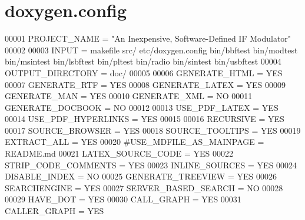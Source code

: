 \hypertarget{doxygen_8config_source}{\section{doxygen.\+config}
\label{doxygen_8config_source}
}

\begin{DoxyCode}
00001 PROJECT\_NAME = "An Inexpensive, Software-Defined IF Modulator"
00002 
00003 INPUT = makefile src/ etc/doxygen.config bin/bbftest bin/modtest bin/msintest bin/lsbftest bin/pltest
       bin/radio bin/sintest bin/usbftest
00004 OUTPUT\_DIRECTORY = doc/
00005 
00006 GENERATE\_HTML = YES
00007 GENERATE\_RTF = YES
00008 GENERATE\_LATEX = YES
00009 GENERATE\_MAN = YES
00010 GENERATE\_XML = NO
00011 GENERATE\_DOCBOOK = NO
00012 
00013 USE\_PDF\_LATEX = YES
00014 USE\_PDF\_HYPERLINKS = YES
00015 
00016 RECURSIVE = YES
00017 SOURCE\_BROWSER = YES
00018 SOURCE\_TOOLTIPS = YES
00019 EXTRACT\_ALL = YES
00020 #USE\_MDFILE\_AS\_MAINPAGE = README.md
00021 LATEX\_SOURCE\_CODE = YES
00022 STRIP\_CODE\_COMMENTS = YES
00023 INLINE\_SOURCES = YES
00024 DISABLE\_INDEX = NO
00025 GENERATE\_TREEVIEW = YES
00026 SEARCHENGINE = YES
00027 SERVER\_BASED\_SEARCH = NO
00028 
00029 HAVE\_DOT = YES
00030 CALL\_GRAPH = YES
00031 CALLER\_GRAPH = YES
\end{DoxyCode}

